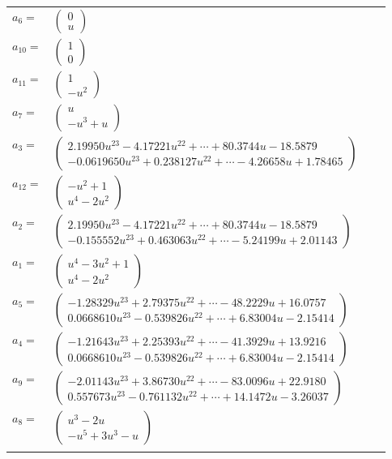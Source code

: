 \documentclass[1p]{elsarticle_modified}
\theoremstyle{definition}
\begin{document}
\begin{tabular}{m{7pt} m{180pt} m{7pt} m{180pt} }
\flushright $a_{6}=$&$\begin{pmatrix}0\\u\end{pmatrix}$ \\
\flushright $a_{10}=$&$\begin{pmatrix}1\\0\end{pmatrix}$ \\
\flushright $a_{11}=$&$\begin{pmatrix}1\\- u^2\end{pmatrix}$ \\
\flushright $a_{7}=$&$\begin{pmatrix}u\\- u^3+u\end{pmatrix}$ \\
\flushright $a_{3}=$&$\begin{pmatrix}2.19950 u^{23}-4.17221 u^{22}+\cdots+80.3744 u-18.5879\\-0.0619650 u^{23}+0.238127 u^{22}+\cdots-4.26658 u+1.78465\end{pmatrix}$ \\
\flushright $a_{12}=$&$\begin{pmatrix}- u^2+1\\u^4-2 u^2\end{pmatrix}$ \\
\flushright $a_{2}=$&$\begin{pmatrix}2.19950 u^{23}-4.17221 u^{22}+\cdots+80.3744 u-18.5879\\-0.155552 u^{23}+0.463063 u^{22}+\cdots-5.24199 u+2.01143\end{pmatrix}$ \\
\flushright $a_{1}=$&$\begin{pmatrix}u^4-3 u^2+1\\u^4-2 u^2\end{pmatrix}$ \\
\flushright $a_{5}=$&$\begin{pmatrix}-1.28329 u^{23}+2.79375 u^{22}+\cdots-48.2229 u+16.0757\\0.0668610 u^{23}-0.539826 u^{22}+\cdots+6.83004 u-2.15414\end{pmatrix}$ \\
\flushright $a_{4}=$&$\begin{pmatrix}-1.21643 u^{23}+2.25393 u^{22}+\cdots-41.3929 u+13.9216\\0.0668610 u^{23}-0.539826 u^{22}+\cdots+6.83004 u-2.15414\end{pmatrix}$ \\
\flushright $a_{9}=$&$\begin{pmatrix}-2.01143 u^{23}+3.86730 u^{22}+\cdots-83.0096 u+22.9180\\0.557673 u^{23}-0.761132 u^{22}+\cdots+14.1472 u-3.26037\end{pmatrix}$ \\
\flushright $a_{8}=$&$\begin{pmatrix}u^3-2 u\\- u^5+3 u^3- u\end{pmatrix}$\\&\end{tabular}
\end{document}
